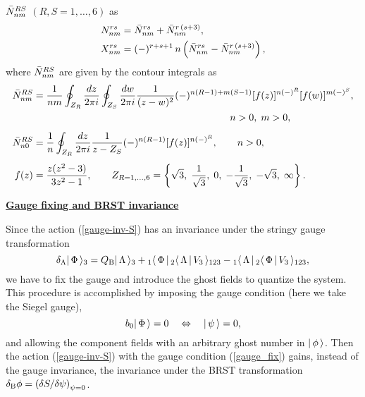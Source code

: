\documentclass[a4paper,12pt]{article}
\begin{document}
$\bar N^{RS}_{nm}$ $(R,S=1,\dots,6)$ as
\begin{align}
  N^{rs}_{nm} & = \bar N^{rs}_{nm} + \bar N^{r\,(s+3)}_{nm}, \\
  X^{rs}_{nm} & = (-)^{r+s+1}\,n\left(\bar N^{rs}_{nm}
                        - \bar N^{r\,(s+3)}_{nm}\right),
\end{align}
where $\bar N^{RS}_{nm}$ are given by the contour integrals as
\begin{align}
  \begin{split}
      \Nsix{RS}{nm} & = \inv{nm}\oint_{Z_R} \frac{dz}{2\pi i}
                     \oint_{Z_S} \frac{dw}{2\pi i} \inv{(z-w)^2}
                    (-)^{n(R-1)+m(S-1)}[f(z)]^{n(-)^R}
                    [f(w)]^{m(-)^S},\\
                    & \hspace*{20em} n>0, \; m>0, \\[1ex]
  \Nsix{RS}{n0} & = \inv{n}\oint_{Z_R} \frac{dz}{2\pi i}
                     \inv{z-Z_S}
               (-)^{n(R-1)}[f(z)]^{n(-)^R}, \quad\quad n>0,\\[1ex]
  f(z) & = \frac{z(z^2-3)}{3z^2-1},\qquad
  Z_{R=1,\dots,6}  = \left\{\sqrt{3}, \;\inv{\sqrt{3}},\; 0,\;
                    -\inv{\sqrt{3}},\; -\sqrt{3},\; \infty \right\}.
  \end{split}
\end{align}

\noindent\underline{\bf Gauge fixing and BRST invariance}

Since the action (\ref{gauge-inv-S}) has an invariance under the
stringy gauge transformation
\begin{equation}
  \label{gauge_trf}
  \delta_{\Lambda} |\, \Phi\, \rangle_{3}=
    Q_{\text B} |\, \Lambda\, \rangle_{3} + {}_1\langle \, \Phi \,|\,{}_2\langle \, \Lambda \,|\, V_3\, \rangle_{123}
   -{}_1\langle \, \Lambda \,|\,{}_2\langle \, \Phi \,|\, V_3\, \rangle_{123},
\end{equation}
we have to fix the gauge and introduce the ghost fields to quantize
the system. This procedure is accomplished by imposing the gauge
condition (here we take the Siegel gauge),
\begin{equation}
  \label{gauge_fix}
  b_0 |\, \Phi\, \rangle = 0\quad
\Leftrightarrow\quad |\, \psi\, \rangle=0,
\end{equation}
and allowing the component fields with an arbitrary ghost number in
$|\, \phi\, \rangle$. Then the action (\ref{gauge-inv-S}) with the gauge
condition (\ref{gauge_fix}) gains, instead of the gauge invariance,
the invariance under the BRST transformation
$\delta_{\text B} \phi = \left(\delta S/\delta\psi\right)_{\psi=0}$.
\end{document}

